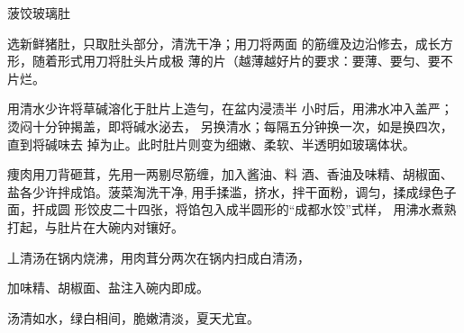 \begin{recipe}{菠饺玻璃肚}

\ingredients


\cooking

\step 	选新鲜猪肚，只取肚头部分，清洗干净；用刀将两面 的筋缠及边沿修去，成长方形，随着形式用刀将肚头片成极 薄的片（越薄越好片的要求：要薄、要匀、要不片烂。

\step 	用清水少许将草碱溶化于肚片上造勻，在盆内浸渍半 小时后，用沸水冲入盖严；烫闷十分钟揭盖，即将碱水泌去， 另换清水；每隔五分钟换一次，如是换四次，直到将碱味去 掉为止。此时肚片则变为细嫩、柔软、半透明如玻璃体状。

\step 	痩肉用刀背砸茸，先用一两剔尽筋缠，加入酱油、料 酒、香油及味精、胡椒面、盐各少许拌成馅。菠菜淘洗干净, 用手揉滥，挤水，拌干面粉，调匀，揉成绿色子面，扞成圆 形饺皮二十四张，将馅包入成半圆形的“成都水饺”式样， 用沸水煮熟打起，与肚片在大碗内对镶好。

丄清汤在锅内烧沸，用肉茸分两次在锅内扫成白清汤，

加味精、胡椒面、盐注入碗内即成。

\notes

汤清如水，绿白相间，脆嫩清淡，夏天尤宜。

\end{recipe}

